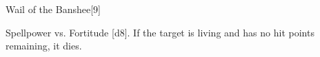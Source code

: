 \begin{spellsection}{Wail of the Banshee}[9]
    \begin{spellheader}
    \end{spellheader}
    \begin{spellcontent}
        \begin{spelltargetinginfo}
        \end{spelltargetinginfo}
        \begin{spelleffects}
            \begin{spellattack}{Spellpower vs. Fortitude}
                \spellsuccess {}[d8]. If the target is living and has no hit points remaining, it dies.
            \end{spellattack}
        \end{spelleffects}
    \end{spellcontent}
    \begin{spellfooter}
        \miscastexplode
    \end{spellfooter}
\end{spellsection}

